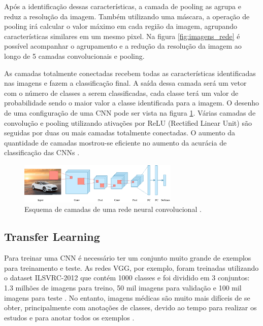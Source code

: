 \documentclass[conference]{IEEEtran}
\begin{document}
Após a identificação dessas características, a camada de pooling as agrupa e reduz a resolução da imagem. Também utilizando uma máscara, a operação de pooling irá calcular o valor máximo em cada região da imagem, agrupando características similares em um mesmo pixel. Na figura \ref{fig:imagens_rede} é possível acompanhar o agrupamento e a redução da resolução da imagem ao longo de 5 camadas convolucionais e pooling.

As camadas totalmente conectadas recebem todas as características identificadas nas imagens e fazem a classificação final. A saída dessa camada será um vetor com o número de classes a serem classificadas, cada classe terá um valor de probabilidade sendo o maior valor a classe identificada para a imagem. O desenho de uma configuração de uma CNN pode ser vista na figura \ref{fig:convolucao}. Várias camadas de convolução e pooling utilizando ativações por ReLU (Rectified Linear Unit) são seguidas por duas ou mais camadas totalmente conectadas. O aumento da quantidade de camadas mostrou-se eficiente no aumento da acurácia de classificação das CNNs \cite{simonyan2014}.


\begin{figure}[!tp]
 \centering
 \includegraphics[width=3in]{img/convolucao.png}
 \caption{Esquema de camadas de uma rede neural convolucional \cite{convTDS}.}
 \label{fig:convolucao}
\end{figure}


  \subsection{Transfer Learning}


  Para treinar uma CNN é necessário ter um conjunto muito grande de exemplos para treinamento e teste. As redes VGG, por exemplo, foram treinadas utilizando o dataset ILSVRC-2012 \cite{ILSVRC15} que contém 1000 classes e foi dividido em 3 conjuntos: 1.3 milhões de imagens para treino, 50 mil imagens para validação e 100 mil imagens para teste \cite{simonyan2014}. No entanto, imagens médicas são muito mais difíceis de se obter, principalmente com anotações de classes, devido ao tempo para realizar os estudos e para anotar todos os exemplos \cite{greenspan2016}.
  
\end{document}
